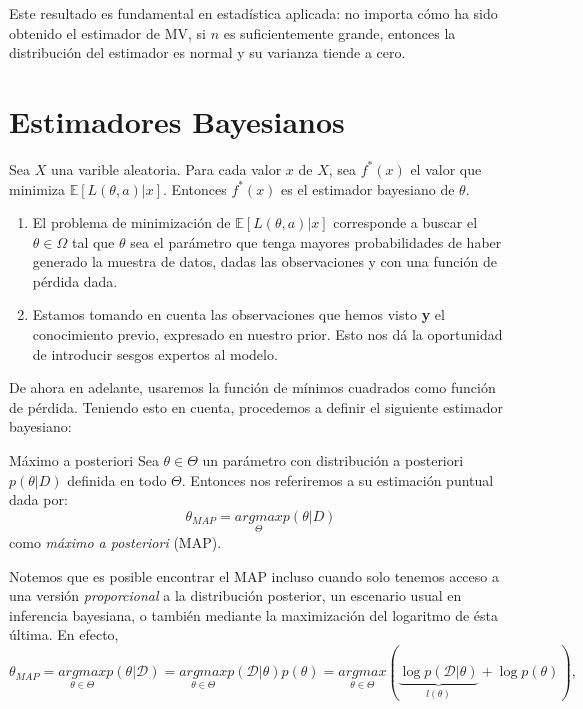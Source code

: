 Este resultado es fundamental en estadística aplicada: no importa cómo ha sido obtenido el estimador de MV, si $n$ es suficientemente grande, entonces la distribución del estimador es normal y su varianza tiende a cero. 

\section{Estimadores Bayesianos}



\begin{definition}
Sea $X$ una varible aleatoria. Para cada valor $x$ de $X$, sea $f^{*}(x)$ el valor que minimiza $\mathbb{E}[L(\theta,a)|x]$. Entonces $f^{*}(x)$ es el estimador bayesiano de $\theta$.
\end{definition}

\begin{remark}
\begin{enumerate}
    \item El problema de minimización de $\mathbb{E}[L(\theta,a)|x]$ corresponde a buscar el $\theta \in \Omega$ tal que $\theta$ sea el parámetro que tenga mayores probabilidades de haber generado la muestra de datos, dadas las observaciones y con una función de pérdida dada. 
    \item Estamos tomando en cuenta las observaciones que hemos visto \textbf{y} el conocimiento previo, expresado en nuestro prior. Esto nos dá la oportunidad de introducir sesgos expertos al modelo.
    \end{enumerate}
\end{remark}

De ahora en adelante, usaremos la función de mínimos cuadrados como función de pérdida. Teniendo esto en cuenta, procedemos a definir el siguiente estimador bayesiano: 

\begin{definition}{Máximo a posteriori}
Sea $\theta \in \Theta$ un parámetro con distribución a posteriori $p(\theta |D)$ definida en todo $\Theta$. Entonces nos referiremos a su estimación puntual dada por: 
$$
\theta_{MAP}= \underset{\Theta}{argmax} p(\theta|D)
$$
como \emph{máximo a posteriori} (MAP). 
\end{definition}

Notemos que es posible encontrar el MAP incluso cuando solo tenemos acceso a una versión \emph{proporcional} a la distribución posterior, un escenario usual en inferencia bayesiana, o también mediante la maximización del logaritmo de ésta última. En efecto, 
$$
\theta_{MAP} = \underset{\theta \in \Theta}{argmax }p(\theta|\mathcal{D}) = \underset{\theta \in \Theta}{argmax }p(\mathcal{D}|\theta)p(\theta)= \underset{\theta \in \Theta}{argmax }\left(\underbrace{\log p(\mathcal{D}|\theta)}_{l(\theta)} + \log p(\theta)\right),
$$

